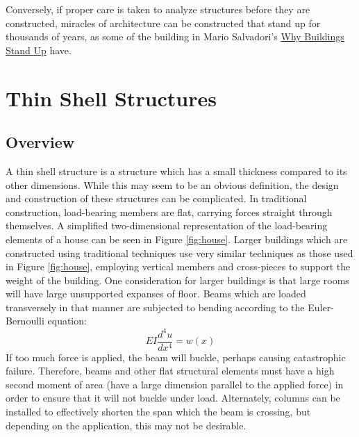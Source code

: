 \documentclass{thesis}
\begin{document}
Conversely, if proper care is taken to analyze structures before they are constructed, miracles of architecture can be constructed that stand
up for thousands of years, as some of the building in Mario Salvadori's \underline{Why Buildings Stand Up}\cite{salvadori80standup} have.


\section{Thin Shell Structures} \label{thinshell}

\subsection{Overview}
A thin shell structure is a structure which has a small thickness compared to its other dimensions.  While this may seem to be
an obvious definition, the design and construction of these structures can be complicated.  In traditional construction, load-bearing
members are flat, carrying forces straight through themselves.  A simplified two-dimensional representation of the load-bearing elements of a house
can be seen in Figure \ref{fig:house}.  Larger buildings which are constructed using traditional techniques use very similar techniques
as those used in Figure \ref{fig:house}, employing vertical members and cross-pieces to support the weight of the building.  One
consideration for larger buildings is that large rooms will have large unsupported expanses of floor.  Beams which are loaded transversely
in that manner are subjected to bending according to the Euler-Bernoulli equation: \[EI\frac{d^4u}{dx^4}=w(x)\]
If too much force is applied, the beam will buckle, perhaps causing catastrophic failure.  Therefore, beams and other flat structural
elements must have a high second moment of area (have a large dimension parallel to the applied force) in order to ensure that it will not
buckle under load.  Alternately, columns can be installed to effectively shorten the span which the beam is crossing, but depending on the
application, this may not be desirable.
\end{document}
